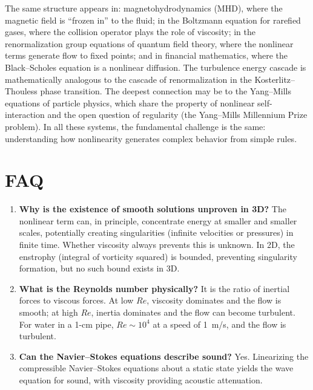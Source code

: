 The same structure appears in: magnetohydrodynamics (MHD), where the magnetic field is ``frozen in'' to the fluid; in the Boltzmann equation for rarefied gases, where the collision operator plays the role of viscosity; in the renormalization group equations of quantum field theory, where the nonlinear terms generate flow to fixed points; and in financial mathematics, where the Black--Scholes equation is a nonlinear diffusion. The turbulence energy cascade is mathematically analogous to the cascade of renormalization in the Kosterlitz--Thouless phase transition. The deepest connection may be to the Yang--Mills equations of particle physics, which share the property of nonlinear self-interaction and the open question of regularity (the Yang--Mills Millennium Prize problem). In all these systems, the fundamental challenge is the same: understanding how nonlinearity generates complex behavior from simple rules.

\section*{FAQ}

\begin{enumerate}
\item \textbf{Why is the existence of smooth solutions unproven in 3D?}
The nonlinear term can, in principle, concentrate energy at smaller and smaller scales, potentially creating singularities (infinite velocities or pressures) in finite time. Whether viscosity always prevents this is unknown. In 2D, the enstrophy (integral of vorticity squared) is bounded, preventing singularity formation, but no such bound exists in 3D.

\item \textbf{What is the Reynolds number physically?}
It is the ratio of inertial forces to viscous forces. At low $Re$, viscosity dominates and the flow is smooth; at high $Re$, inertia dominates and the flow can become turbulent. For water in a 1-cm pipe, $Re \sim 10^{4}$ at a speed of 1~m/s, and the flow is turbulent.

\item \textbf{Can the Navier--Stokes equations describe sound?}
Yes. Linearizing the compressible Navier--Stokes equations about a static state yields the wave equation for sound, with viscosity providing acoustic attenuation.
\end{enumerate}
